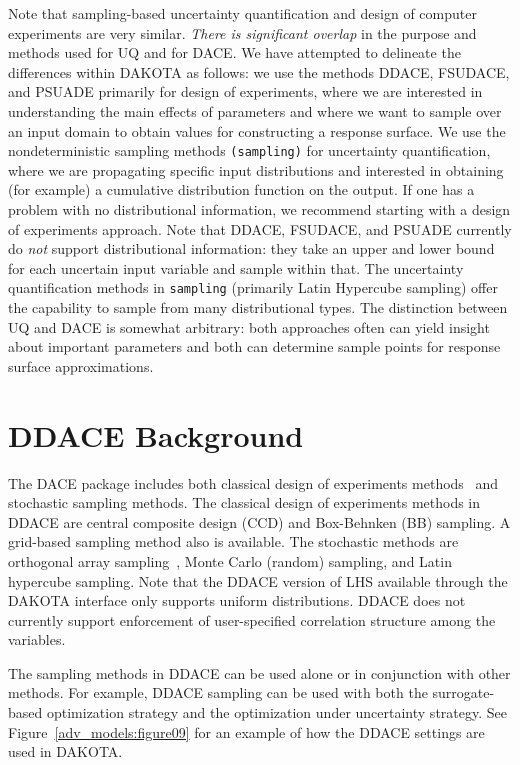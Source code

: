 Note that sampling-based uncertainty quantification and design of
computer experiments are very similar.  \emph{There is significant
overlap} in the purpose and methods used for UQ and for DACE.  We have
attempted to delineate the differences within DAKOTA as follows: we
use the methods DDACE, FSUDACE, and PSUADE primarily for design of
experiments, where we are interested in understanding the main effects
of parameters and where we want to sample over an input domain to
obtain values for constructing a response surface.  We use the
nondeterministic sampling methods \texttt{(sampling)} for
uncertainty quantification, where we are propagating specific input
distributions and interested in obtaining (for example) a cumulative
distribution function on the output.  If one has a problem with no
distributional information, we recommend starting with a design of
experiments approach.  Note that DDACE, FSUDACE, and PSUADE currently
do \emph{not} support distributional information: they take an upper
and lower bound for each uncertain input variable and sample within
that.  The uncertainty quantification methods in
\texttt{sampling} (primarily Latin Hypercube sampling) offer the
capability to sample from many distributional types.  The distinction
between UQ and DACE is somewhat arbitrary: both approaches often can
yield insight about important parameters and both can determine sample
points for response surface approximations.

\section{DDACE Background}\label{dace:ddace}

The DACE package includes both classical design of experiments
methods~\cite{TonXX} and stochastic sampling methods. The classical
design of experiments methods in DDACE are central composite design
(CCD) and Box-Behnken (BB) sampling. A grid-based sampling method also
is available. The stochastic methods are orthogonal array
sampling~\cite{Koe96}, Monte Carlo (random) sampling, and Latin
hypercube sampling.  Note that the DDACE version of LHS available through the
DAKOTA interface only supports uniform distributions.  DDACE does not
currently support enforcement of user-specified correlation structure
among the variables.

The sampling methods in DDACE can be used alone or in conjunction with
other methods. For example, DDACE sampling can be used with both the
surrogate-based optimization strategy and the optimization under
uncertainty strategy. See Figure~\ref{adv_models:figure09} for an
example of how the DDACE settings are used in DAKOTA.

